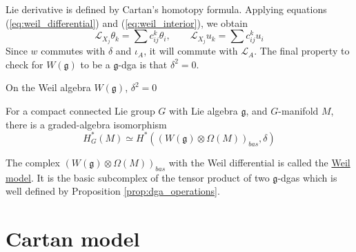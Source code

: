 Lie derivative is defined by Cartan's homotopy formula. 
Applying equations (\ref{eq:weil_differential}) and (\ref{eq:weil_interior}), we
obtain 
\begin{equation} \label{eq:weil_lie}
\mathcal{L}_{X_j} \theta_k = \sum c_{ij}^k \theta_i , \qquad
\mathcal{L}_{X_j}u_k = \sum c_{ij}^k u_i
\end{equation}
Since  $w$ commutes with
 $\delta$ and  $\iota_A$, it will commute with  $\mathcal{L}_A$.
The final property to check for $W(\mathfrak{g})$ to be a  $\mathfrak{g}$-dga
is that  $\delta^2 = 0$. 
\begin{thm} %
	On the Weil algebra $W(\mathfrak{g})$, $\delta^2=0$
\end{thm}


\begin{thm} \label{thm:equivariant_de_Rham} %
	For a compact connected Lie group $G$ with Lie algebra $\mathfrak{g}$, and
	$G$-manifold  $M$, there is a graded-algebra isomorphism 
	 \[
		 H_G^*(M) \simeq H^*((W(\mathfrak{g})\otimes \Omega(M))_{bas}, \delta)
	\] 
\end{thm}
The complex $(W(\mathfrak{g})\otimes \Omega(M))_{bas}$ with the Weil
differential is called the \underline{Weil model}. It is the basic subcomplex of
the tensor product of two $\mathfrak{g}$-dgas which is well defined by
Proposition \ref{prop:dga_operations}.


\section{Cartan model}
